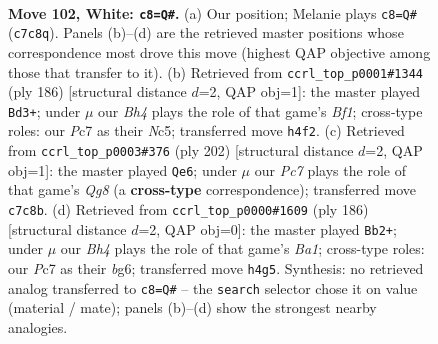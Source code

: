 \documentclass[11pt]{article}
\begin{document}
\clearpage

\begin{figure}[p]\centering
\begin{subfigure}{0.46\textwidth}\centering
\resizebox{\linewidth}{!}{%
\newchessgame
\chessboard[
  setfen={6k1/2P5/6K1/8/7B/8/8/8 w - - 29 102},
  showmover=false,
  pgfstyle=straightmove, color=movearrow, markmove={c7-c8}
]}
\caption{}
\end{subfigure}\hfill
\begin{subfigure}{0.46\textwidth}\centering
\resizebox{\linewidth}{!}{%
\newchessgame
\chessboard[
  setfen={8/8/8/2N5/8/K7/8/1k3B2 w - - 14 94},
  showmover=false,
  pgfstyle=straightmove, color=movearrow, markmove={f1-d3}
]}
\caption{}
\end{subfigure}
\\[4pt]
\begin{subfigure}{0.46\textwidth}\centering
\resizebox{\linewidth}{!}{%
\newchessgame
\chessboard[
  setfen={6Q1/8/5K2/8/5k2/8/8/5B2 w - - 1 102},
  showmover=false,
  pgfstyle=straightmove, color=movearrow, markmove={g8-e6}
]}
\caption{}
\end{subfigure}\hfill
\begin{subfigure}{0.46\textwidth}\centering
\resizebox{\linewidth}{!}{%
\newchessgame
\chessboard[
  setfen={8/8/6b1/8/8/k7/8/B1K5 w - - 8 94},
  showmover=false,
  pgfstyle=straightmove, color=movearrow, markmove={a1-b2}
]}
\caption{}
\end{subfigure}
\caption{\textbf{Move 102, White: \texttt{c8=Q\#}.} (a) Our position; Melanie plays \texttt{c8=Q\#} (\texttt{c7c8q}). Panels (b)--(d) are the retrieved master positions whose correspondence most drove this move (highest QAP objective among those that transfer to it). (b) Retrieved from \texttt{ccrl\_top\_p0001\#1344} (ply 186) [structural distance $d$=2, QAP obj=1]: the master played \texttt{Bd3+}; under $\mu$ our \emph{Bh4} plays the role of that game's \emph{Bf1}; cross-type roles: our \emph{P}c7 as their \emph{N}c5; transferred move \texttt{h4f2}. (c) Retrieved from \texttt{ccrl\_top\_p0003\#376} (ply 202) [structural distance $d$=2, QAP obj=1]: the master played \texttt{Qe6}; under $\mu$ our \emph{Pc7} plays the role of that game's \emph{Qg8} (a \textbf{cross-type} correspondence); transferred move \texttt{c7c8b}. (d) Retrieved from \texttt{ccrl\_top\_p0000\#1609} (ply 186) [structural distance $d$=2, QAP obj=0]: the master played \texttt{Bb2+}; under $\mu$ our \emph{Bh4} plays the role of that game's \emph{Ba1}; cross-type roles: our \emph{P}c7 as their \emph{b}g6; transferred move \texttt{h4g5}. Synthesis: no retrieved analog transferred to \texttt{c8=Q\#} -- the \texttt{search} selector chose it on value (material / mate); panels (b)--(d) show the strongest nearby analogies.}
\label{fig:thought-m202}
\end{figure}
\end{document}
